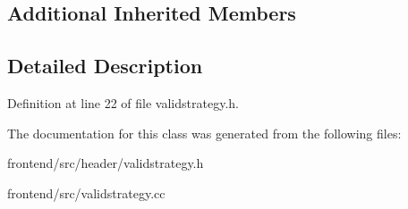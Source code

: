 \subsection*{Additional Inherited Members}


\subsection{Detailed Description}


Definition at line 22 of file validstrategy.\-h.



The documentation for this class was generated from the following files\-:\begin{DoxyCompactItemize}
\item 
frontend/src/header/validstrategy.\-h\item 
frontend/src/validstrategy.\-cc\end{DoxyCompactItemize}
